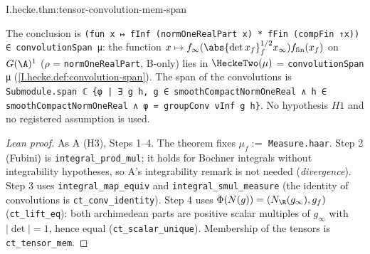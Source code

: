 \begin{tfformal}{I.hecke.thm:tensor-convolution-mem-span}
\begin{tffidelity}
The conclusion is \texttt{(fun x ↦ fInf (normOneRealPart x) * fFin (compFin ↑x)) ∈ convolutionSpan μ}: the function $x\mapsto f_\infty(\abs{\det x_f}_f^{1/2}x_\infty)f_{\mathrm{fin}}(x_f)$ on $G(\A)^1$ ($\rho$ = \texttt{normOneRealPart}, B-only) lies in $\HeckeTwo(\mu)$ = \texttt{convolutionSpan μ} (\cref{I.hecke.def:convolution-span}). The span of the convolutions is \texttt{Submodule.span ℂ \{φ | ∃ g h, g ∈ smoothCompactNormOneReal ∧ h ∈ smoothCompactNormOneReal ∧ φ = groupConv νInf g h\}}. No hypothesis $H1$ and no registered assumption is used.
\end{tffidelity}
\end{tfformal}
\begin{proof}[Lean proof]
As A (H3), Steps 1--4. The theorem fixes $\mu_f:=$ \texttt{Measure.haar}. Step 2 (Fubini) is \texttt{integral\_prod\_mul}; it holds for Bochner integrals without integrability hypotheses, so A's integrability remark is not needed (\emph{divergence}). Step 3 uses \texttt{integral\_map\_equiv} and \texttt{integral\_smul\_measure} (the identity of convolutions is \texttt{ct\_conv\_identity}). Step 4 uses $\Phi(N(g))=(N_\R(g_\infty),g_f)$ (\texttt{ct\_lift\_eq}): both archimedean parts are positive scalar multiples of $g_\infty$ with $|\det|=1$, hence equal (\texttt{ct\_scalar\_unique}). Membership of the tensors is \texttt{ct\_tensor\_mem}.
\end{proof}

